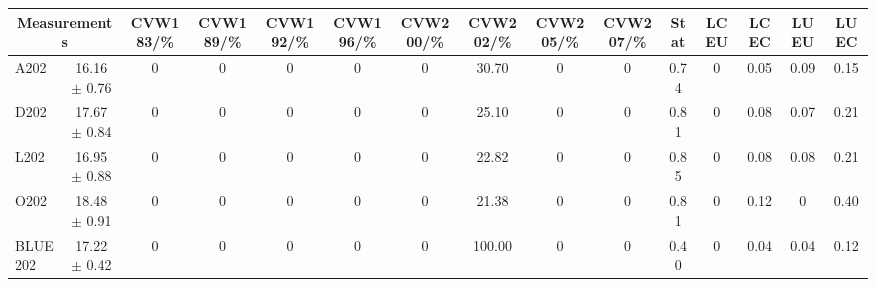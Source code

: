 \begin{table}[H]
\scriptsize
\begin{center}
\renewcommand{\arraystretch}{1.1}
\begin{tabular}{|lc|c|c|c|c|c|c|c|c|ccccc|}
\hline
\multicolumn{2}{|c|}{Measurements} & CVW{\tiny 183}/\%  & CVW{\tiny 189}/\%  & CVW{\tiny 192}/\%  & CVW{\tiny 196}/\%  & CVW{\tiny 200}/\%  & CVW{\tiny 202}/\%  & CVW{\tiny 205}/\%  & CVW{\tiny 207}/\%  & {\tiny Stat} & {\tiny LCEU} & {\tiny LCEC} & {\tiny LUEU} & {\tiny LUEC}\\
\hline
A202 &      16.16 $\pm$       0.76 &  0 &  0 &  0 &  0 &  0 &      30.70 &  0 &  0 &       0.74 &  0 &       0.05 &       0.09 &       0.15\\
D202 &      17.67 $\pm$       0.84 &  0 &  0 &  0 &  0 &  0 &      25.10 &  0 &  0 &       0.81 &  0 &       0.08 &       0.07 &       0.21\\
L202 &      16.95 $\pm$       0.88 &  0 &  0 &  0 &  0 &  0 &      22.82 &  0 &  0 &       0.85 &  0 &       0.08 &       0.08 &       0.21\\
O202 &      18.48 $\pm$       0.91 &  0 &  0 &  0 &  0 &  0 &      21.38 &  0 &  0 &       0.81 &  0 &       0.12 &  0 &       0.40\\
\hline
BLUE {\tiny 202} &      17.22 $\pm$       0.42 &  0 &  0 &  0 &  0 &  0 &     100.00 &  0 &  0 &       0.40 &  0 &       0.04 &       0.04 &       0.12\\
\hline
\end{tabular}
\renewcommand{\arraystretch}{1}
\end{center}
\end{table}
\vspace*{-0.5cm}
